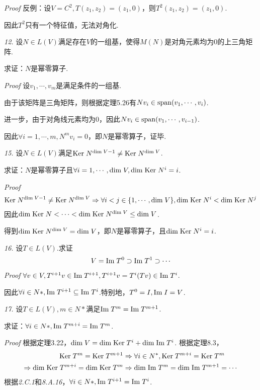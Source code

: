 \textit{Proof}
反例：设\(V=C^2,T(z_1,z_2)=(z_1,0)\)，则\(T^2(z_1,z_2)=(z_1,0)\).

因此\(T^2\)只有一个特征值，无法对角化.

\newpage

\textit{12.}
设\(N \in L(V)\)满足存在\(V\)的一组基，使得\(M(N)\)是对角元素均为\(0\)的上三角矩阵.

求证：\(N\)是幂零算子.

\textit{Proof}
设\(v_1,\cdots,v_m\)是满足条件的一组基.

由于该矩阵是三角矩阵，则根据定理5.26有\(Nv_i \in \mathrm{span} (v_1,\cdots,v_i)\).

进一步，由于对角线元素均为\(0\)，因此\(Nv_i \in \mathrm{span} (v_1,\cdots,v_{i-1})\).

因此\(\forall i=1,\cdots,m,N^m v_i=0\)，即\(N\)是幂零算子，证毕.

\hspace*{\fill}

\textit{15.}
设\(N \in L(V)\)满足\(\mathrm{Ker \;} N^{\mathrm{dim \;} V-1} \ne \mathrm{Ker \;} N^{\mathrm{dim \;} V}\).

求证：\(N\)是幂零算子且\(\forall i=1,\cdots,\mathrm{dim \;} V,\mathrm{dim \;} \mathrm{Ker \;} N^i=i\).

\textit{Proof}
    \begin{align*}
        \mathrm{Ker \;} N^{\mathrm{dim \;} V-1} \ne \mathrm{Ker \;} N^{\mathrm{dim \;} V} \Rightarrow 
        \forall i<j \in \{1,\cdots,\mathrm{dim \;} V\},\mathrm{dim \;} \mathrm{Ker \;} N^i<\mathrm{dim \;} \mathrm{Ker \;} N^j
    \end{align*}
因此\(\mathrm{dim \;} \mathrm{Ker \;} N<\cdots<\mathrm{dim \;} \mathrm{Ker \;} N^{\mathrm{dim \;} V} \leq \mathrm{dim \;} V\).

得到\(\mathrm{dim \;} \mathrm{Ker \;} N^{\mathrm{dim \;} V}=\mathrm{dim \;} V\)，即\(N\)是幂零算子，且\(\mathrm{dim \;} \mathrm{Ker \;} N^i=i\).

\hspace*{\fill}

\textit{16.}
设\(T \in L(V)\).求证
    \begin{align*}
        V=\mathrm{Im \;} T^0 \supset \mathrm{Im \;} T^1 \supset \cdots
    \end{align*}
\textit{Proof}
\(\forall v \in V,T^{i+1}v \in \mathrm{Im \;} T^{i+1},T^{i+1}v=T^i(Tv) \in \mathrm{Im \;} T^i\).

因此\(\forall i \in N*,\mathrm{Im \;} T^{i+1} \subseteq \mathrm{Im \;} T^i\).特别地，\(T^0=I,\mathrm{Im \;} I=V\).

\hspace*{\fill}

\textit{17.}
设\(T \in L(V),m \in N*\)满足\(\mathrm{Im \;} T^m=\mathrm{Im \;} T^{m+1}\).

求证：\(\forall i \in N*,\mathrm{Im \;} T^{m+i}=\mathrm{Im \;} T^m\).

\textit{Proof}
根据定理3.22，\(\mathrm{dim \;} V=\mathrm{dim \;} \mathrm{Ker \;} T^i+\mathrm{dim \;} \mathrm{Im \;} T^i\).
根据定理8.3，
    \begin{align*}
        \mathrm{Ker \;} T^m=\mathrm{Ker \;} T^{m+1} &\Rightarrow \forall i \in N^*,\mathrm{Ker \;} T^{m+i}=\mathrm{Ker \;} T^m \\
        \Rightarrow \mathrm{dim \;} \mathrm{Ker \;} T^{m+i}=\mathrm{dim \;} \mathrm{Ker \;} T^m
        &\Rightarrow \mathrm{dim \;} \mathrm{Im \;} T^m=\mathrm{dim \;} \mathrm{Im \;} T^{m+1}=\cdots
    \end{align*}
根据\textit{2.C.1}和\textit{8.A.16}，\(\forall i \in N*,\mathrm{Im \;} T^{i+1}=\mathrm{Im \;} T^i\).

